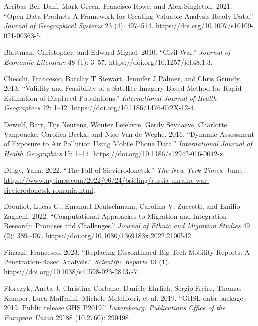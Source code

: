 \documentclass[
  sn-nature,
  11pt,
]{sn-jnl}
\newlength{\cslhangindent}
\newenvironment{CSLReferences}[2] %
 {\begin{list}{}{%
  \setlength{\itemindent}{0pt}
  \setlength{\leftmargin}{0pt}
  \setlength{\parsep}{0pt}
  \ifodd #1
   \setlength{\leftmargin}{\cslhangindent}
   \setlength{\itemindent}{-1\cslhangindent}
  \fi
  \setlength{\itemsep}{#2\baselineskip}}}
 {\end{list}}
\begin{document}
\label{refs}
\begin{CSLReferences}{1}{0}
Arribas-Bel, Dani, Mark Green, Francisco Rowe, and Alex Singleton. 2021.
{``Open Data Products-A Framework for Creating Valuable Analysis Ready
Data.''} \emph{Journal of Geographical Systems} 23 (4): 497--514.
\url{https://doi.org/10.1007/s10109-021-00363-5}.

Blattman, Christopher, and Edward Miguel. 2010. {``Civil War.''}
\emph{Journal of Economic Literature} 48 (1): 3--57.
\url{https://doi.org/10.1257/jel.48.1.3}.

Checchi, Francesco, Barclay T Stewart, Jennifer J Palmer, and Chris
Grundy. 2013. {``Validity and Feasibility of a Satellite Imagery-Based
Method for Rapid Estimation of Displaced Populations.''}
\emph{International Journal of Health Geographics} 12: 1--12.
\url{https://doi.org/10.1186/1476-072X-12-4}.

Dewulf, Bart, Tijs Neutens, Wouter Lefebvre, Gerdy Seynaeve, Charlotte
Vanpoucke, Carolien Beckx, and Nico Van de Weghe. 2016. {``Dynamic
Assessment of Exposure to Air Pollution Using Mobile Phone Data.''}
\emph{International Journal of Health Geographics} 15: 1--14.
\url{https://doi.org/10.1186/s12942-016-0042-z}.

Dlugy, Yana. 2022. {``The Fall of {Sievierodonetsk}.''} \emph{{The New
York Times}}, June.
\url{https://www.nytimes.com/2022/06/24/briefing/russia-ukraine-war-sievierodonetsk-romania.html}.

Drouhot, Lucas G., Emanuel Deutschmann, Carolina V. Zuccotti, and Emilio
Zagheni. 2022. {``Computational Approaches to Migration and Integration
Research: Promises and Challenges.''} \emph{Journal of Ethnic and
Migration Studies} 49 (2): 389--407.
\url{https://doi.org/10.1080/1369183x.2022.2100542}.

Finazzi, Francesco. 2023. {``Replacing Discontinued Big Tech Mobility
Reports: A Penetration-Based Analysis.''} \emph{Scientific Reports} 13
(1). \url{https://doi.org/10.1038/s41598-023-28137-7}.

Florczyk, Aneta J, Christina Corbane, Daniele Ehrlich, Sergio Freire,
Thomas Kemper, Luca Maffenini, Michele Melchiorri, et al. 2019. {``{GHSL
data package 2019. Public release GHS P2019}.''} \emph{{Luxembourg:
Publications Office of the European Union}} 29788 (10.2760): 290498.


\end{CSLReferences}
\end{document}
